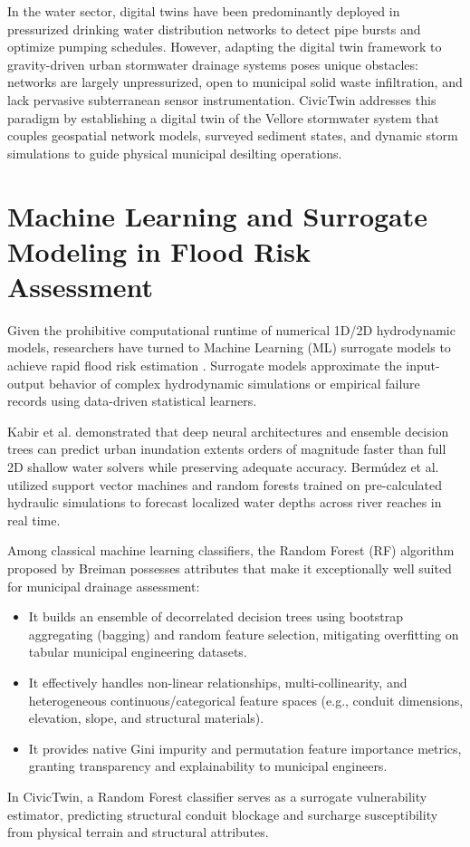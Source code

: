 In the water sector, digital twins have been predominantly deployed in pressurized drinking water distribution networks to detect pipe bursts and optimize pumping schedules. However, adapting the digital twin framework to gravity-driven urban stormwater drainage systems poses unique obstacles: networks are largely unpressurized, open to municipal solid waste infiltration, and lack pervasive subterranean sensor instrumentation. CivicTwin addresses this paradigm by establishing a digital twin of the Vellore stormwater system that couples geospatial network models, surveyed sediment states, and dynamic storm simulations to guide physical municipal desilting operations.

\section{Machine Learning and Surrogate Modeling in Flood Risk Assessment}
Given the prohibitive computational runtime of numerical 1D/2D hydrodynamic models, researchers have turned to Machine Learning (ML) surrogate models to achieve rapid flood risk estimation \cite{bermudez2018rapid, bomers2019surrogate}. Surrogate models approximate the input-output behavior of complex hydrodynamic simulations or empirical failure records using data-driven statistical learners.

Kabir et al. \cite{kabir2020deep} demonstrated that deep neural architectures and ensemble decision trees can predict urban inundation extents orders of magnitude faster than full 2D shallow water solvers while preserving adequate accuracy. Berm{\'u}dez et al. \cite{bermudez2018rapid} utilized support vector machines and random forests trained on pre-calculated hydraulic simulations to forecast localized water depths across river reaches in real time.

Among classical machine learning classifiers, the Random Forest (RF) algorithm proposed by Breiman \cite{breiman2001random} possesses attributes that make it exceptionally well suited for municipal drainage assessment:
\begin{itemize}
    \item It builds an ensemble of decorrelated decision trees using bootstrap aggregating (bagging) and random feature selection, mitigating overfitting on tabular municipal engineering datasets.
    \item It effectively handles non-linear relationships, multi-collinearity, and heterogeneous continuous/categorical feature spaces (e.g., conduit dimensions, elevation, slope, and structural materials).
    \item It provides native Gini impurity and permutation feature importance metrics, granting transparency and explainability to municipal engineers.
\end{itemize}
In CivicTwin, a Random Forest classifier serves as a surrogate vulnerability estimator, predicting structural conduit blockage and surcharge susceptibility from physical terrain and structural attributes.

